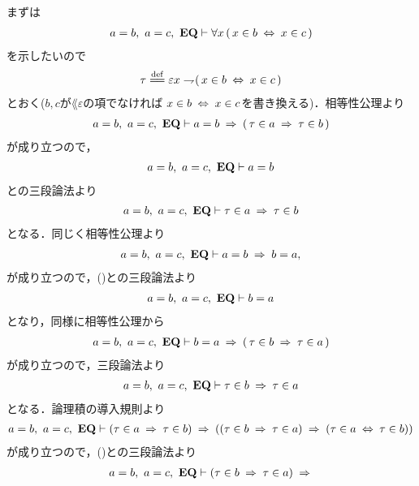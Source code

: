 	\begin{sketch}
		まずは
		\begin{align}
			a = b,\ a = c,\ \mbox{{\bf EQ}} \vdash \forall x\, (\, x \in b \hspace{0.25em}\Leftrightarrow\hspace{0.25em} x \in c\, )
		\end{align}
		を示したいので
		\begin{align}
			\tau \defeq \varepsilon x \negation (\, x \in b \lrarrow x \in c\, )
		\end{align}
		とおく($b,c$が$\lang{\varepsilon}$の項でなければ
		$x \in b \hspace{0.25em}\Leftrightarrow\hspace{0.25em} x \in c$を書き換える)．相等性公理より
		\begin{align}
			a = b,\ a = c,\ \mbox{{\bf EQ}} \vdash a = b \hspace{0.25em}\Rightarrow\hspace{0.25em} (\, \tau \in a \hspace{0.25em}\Rightarrow\hspace{0.25em} \tau \in b\, )
		\end{align}
		が成り立つので，
		\begin{align}
			a = b,\ a = c,\ \mbox{{\bf EQ}} \vdash a = b
			\label{fom:thm_transitive_law_of_equality_0}
		\end{align}
		との三段論法より
		\begin{align}
			a = b,\ a = c,\ \mbox{{\bf EQ}} \vdash \tau \in a \hspace{0.25em}\Rightarrow\hspace{0.25em} \tau \in b
			\label{fom:thm_transitive_law_of_equality_1}
		\end{align}
		となる．同じく相等性公理より
		\begin{align}
			a = b,\ a = c,\ \mbox{{\bf EQ}} \vdash a = b \hspace{0.25em}\Rightarrow\hspace{0.25em} b = a, \\
		\end{align}
		が成り立つので，()との三段論法より
		\begin{align}
			a = b,\ a = c,\ \mbox{{\bf EQ}} \vdash b = a
		\end{align}
		となり，同様に相等性公理から
		\begin{align}
			a = b,\ a = c,\ \mbox{{\bf EQ}} \vdash b = a \hspace{0.25em}\Rightarrow\hspace{0.25em} (\, \tau \in b \hspace{0.25em}\Rightarrow\hspace{0.25em} \tau \in a\, )
		\end{align}
		が成り立つので，三段論法より
		\begin{align}
			a = b,\ a = c,\ \mbox{{\bf EQ}} \vdash \tau \in b \hspace{0.25em}\Rightarrow\hspace{0.25em} \tau \in a
			\label{fom:thm_transitive_law_of_equality_2}
		\end{align}
		となる．論理積の導入規則より
		\begin{align}
			a = b,\ a = c,\ \mbox{{\bf EQ}} \vdash (\tau \in a \hspace{0.25em}\Rightarrow\hspace{0.25em} \tau \in b)
			\hspace{0.25em}\Rightarrow\hspace{0.25em} ((\tau \in b \hspace{0.25em}\Rightarrow\hspace{0.25em} \tau \in a) \hspace{0.25em}\Rightarrow\hspace{0.25em} 
			(\tau \in a \hspace{0.25em}\Leftrightarrow\hspace{0.25em} \tau \in b))
		\end{align}
		が成り立つので，()との三段論法より
		\begin{align}
			a = b,\ a = c,\ \EQAX \vdash (\tau \in b \rarrow \tau \in a) \rarrow 

\end{align}
\end{sketch}
